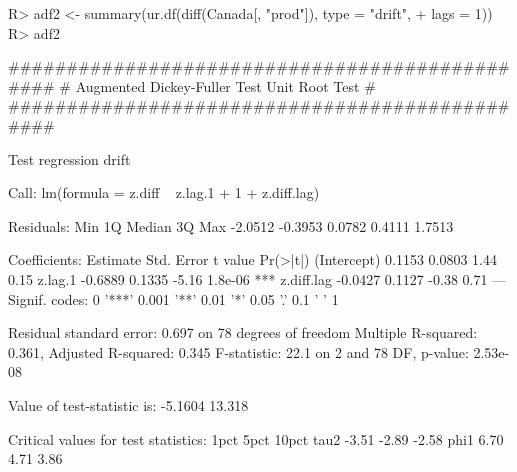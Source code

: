\documentclass[nojss]{jss}
\begin{document}
\begin{Schunk}
\begin{Sinput}
R> adf2 <- summary(ur.df(diff(Canada[, "prod"]), type = "drift", 
+    lags = 1))
R> adf2
\end{Sinput}
\begin{Soutput}
############################################### 
# Augmented Dickey-Fuller Test Unit Root Test # 
############################################### 

Test regression drift 


Call:
lm(formula = z.diff ~ z.lag.1 + 1 + z.diff.lag)

Residuals:
    Min      1Q  Median      3Q     Max 
-2.0512 -0.3953  0.0782  0.4111  1.7513 

Coefficients:
            Estimate Std. Error t value Pr(>|t|)    
(Intercept)   0.1153     0.0803    1.44     0.15    
z.lag.1      -0.6889     0.1335   -5.16  1.8e-06 ***
z.diff.lag   -0.0427     0.1127   -0.38     0.71    
---
Signif. codes:  0 '***' 0.001 '**' 0.01 '*' 0.05 '.' 0.1 ' ' 1 

Residual standard error: 0.697 on 78 degrees of freedom
Multiple R-squared: 0.361,	Adjusted R-squared: 0.345 
F-statistic: 22.1 on 2 and 78 DF,  p-value: 2.53e-08 


Value of test-statistic is: -5.1604 13.318 

Critical values for test statistics: 
      1pct  5pct 10pct
tau2 -3.51 -2.89 -2.58
phi1  6.70  4.71  3.86
\end{Soutput}
\end{Schunk}
\end{document}
